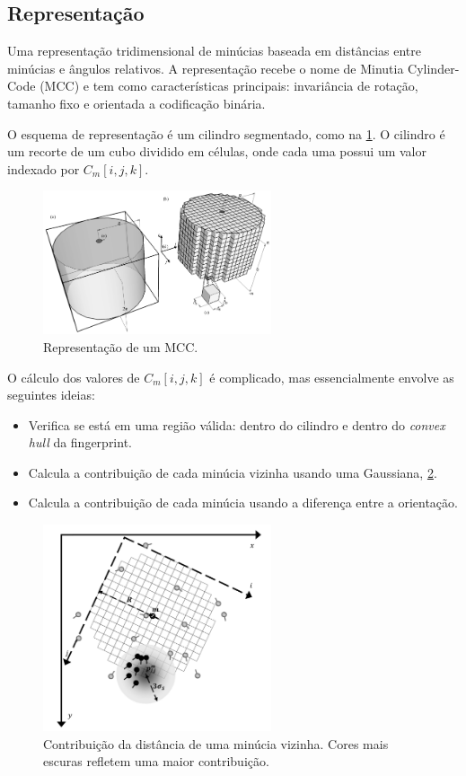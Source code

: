 \subsection{Representação}

Uma representação tridimensional de minúcias baseada em distâncias entre minúcias e ângulos relativos. A representação recebe o nome de Minutia Cylinder-Code (MCC) e tem como características principais: invariância de rotação, tamanho fixo e orientada a codificação binária.

O esquema de representação é um cilindro segmentado, como na \cref{fig:mcc}. O cilindro é um recorte de um cubo dividido em células, onde cada uma possui um valor indexado por $C_m[i, j, k]$.

\begin{figure}
    \centering
    \includegraphics[width=0.6\textwidth]{imgs/fingerprint_cylinder_code.png}
    \caption{Representação de um MCC.}
    \label{fig:mcc}
\end{figure}

O cálculo dos valores de $C_m[i, j, k]$ é complicado, mas essencialmente envolve as seguintes ideias:
\begin{itemize}
\item Verifica se está em uma região válida: dentro do cilindro e dentro do \textit{convex hull} da fingerprint.
\item Calcula a contribuição de cada minúcia vizinha usando uma Gaussiana, \cref{fig:mccdist}.
\item Calcula a contribuição de cada minúcia usando a diferença entre a orientação.
\end{itemize}

\begin{figure}
    \centering
    \includegraphics[width=0.6\textwidth]{imgs/eval_cylinder.png}
    \caption{Contribuição da distância de uma minúcia vizinha. Cores mais escuras refletem uma maior contribuição.}
    \label{fig:mccdist}
\end{figure}

